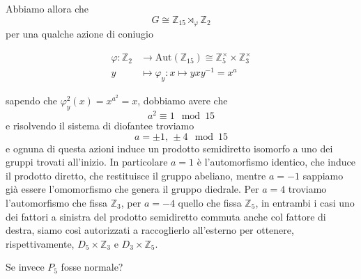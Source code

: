 \documentclass[a4paper]{article}
\theoremstyle{remark}
\theoremstyle{definition}
\newcommand{\Aut}[1]{\mathrm{Aut}\left( #1 \right)}
\newcommand{\Z}{\mathbb{Z}}
\newcommand{\fun}[5]{
	\begin{align*}
	#1 \colon #2 &\to #3 \\
	#4 &\mapsto #5
	\end{align*}
}
\begin{document}
\begin{multicols}{2}
Abbiamo allora che
\[ G \cong \mathbb{Z}_{15} \rtimes_\varphi \mathbb{Z}_2 \]
per una qualche azione di coniugio 
\fun{\varphi}{\mathbb{Z}_2}{\Aut{\mathbb{Z}_{15}}\cong \mathbb{Z}_5^\times\times\mathbb{Z}_3^\times}{y}{\varphi_y: x \mapsto yxy^{-1} = x^a}
sapendo che $ \varphi_y^2(x) = x^{a^2} = x $, dobbiamo avere che $$  a^2 \equiv 1 \mod{15}  $$ e risolvendo il sistema di diofantee troviamo
\[ a = \pm 1,\, \pm 4 \mod{15} \]
e ognuna di questa azioni induce un prodotto semidiretto isomorfo a uno dei gruppi trovati all'inizio. In particolare $ a = 1 $ è l'automorfismo identico, che induce il prodotto diretto, che restituisce il gruppo abeliano, mentre $ a = -1 $ sappiamo già essere l'omomorfismo che genera il gruppo diedrale. Per $ a = 4 $ troviamo l'automorfismo che fissa $ \mathbb{Z}_3 $, per $ a = -4 $ quello che fissa $ \mathbb{Z}_5 $, in entrambi i casi uno dei fattori a sinistra del prodotto semidiretto commuta anche col fattore di destra, siamo così autorizzati a raccoglierlo all'esterno per ottenere, rispettivamente, $ D_5\times\mathbb{Z}_3 $ e $ D_{3}\times\Z_5 $.
	
Se invece $ P_5 $ fosse normale?
	
\end{multicols}
\end{document}
